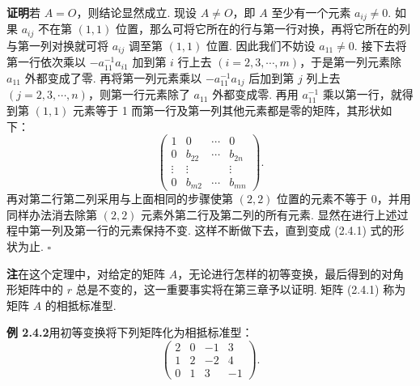 \documentclass[UTF8,12pt,a4paper,fontset=fandol]{ctexart}
\begin{document}
\noindent\textbf{证明}\quad 若 $A=O$，则结论显然成立. 现设 $A\ne O$，即 $A$ 至少有一个元素 $a_{ij}\ne 0$. 如果 $a_{ij}$ 不在第 $(1,1)$ 位置，那么可将它所在的行与第一行对换，再将它所在的列与第一列对换就可将 $a_{ij}$ 调至第 $(1,1)$ 位置. 因此我们不妨设 $a_{11}\ne 0$. 接下去将第一行依次乘以 $-a_{11}^{-1}a_{i1}$ 加到第 $i$ 行上去 $(i=2,3,\cdots,m)$，于是第一列元素除 $a_{11}$ 外都变成了零. 再将第一列元素乘以 $-a_{11}^{-1}a_{1j}$ 后加到第 $j$ 列上去 $(j=2,3,\cdots,n)$，则第一行元素除了 $a_{11}$ 外都变成零. 再用 $a_{11}^{-1}$ 乘以第一行，就得到第 $(1,1)$ 元素等于 1 而第一行及第一列其他元素都是零的矩阵，其形状如下：
\[
\left(\begin{array}{cccc}
1 & 0 & \cdots & 0\\
0 & b_{22} & \cdots & b_{2n}\\
\vdots & \vdots & & \vdots\\
0 & b_{m2} & \cdots & b_{mn}
\end{array}\right).
\]
再对第二行第二列采用与上面相同的步骤使第 $(2,2)$ 位置的元素不等于 0，并用同样办法消去除第 $(2,2)$ 元素外第二行及第二列的所有元素. 显然在进行上述过程中第一列及第一行的元素保持不变. 这样不断做下去，直到变成 (2.4.1) 式的形状为止. $\square$

\noindent\textbf{注}\quad 在这个定理中，对给定的矩阵 $A$，无论进行怎样的初等变换，最后得到的对角形矩阵中的 $r$ 总是不变的，这一重要事实将在第三章予以证明. 矩阵 (2.4.1) 称为矩阵 $A$ 的相抵标准型.

\noindent\textbf{例 2.4.2}\quad 用初等变换将下列矩阵化为相抵标准型：
\[
\left(\begin{array}{cccc}
2 & 0 & -1 & 3\\
1 & 2 & -2 & 4\\
0 & 1 & 3 & -1
\end{array}\right).
\]
\end{document}
